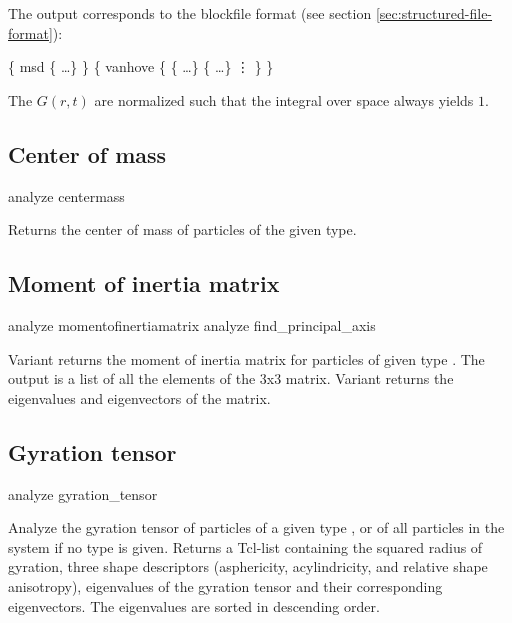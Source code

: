 The output corresponds to the blockfile format (see section
\vref{sec:structured-file-format}):
\begin{code}
\{ msd \{   \dots \} \} 
\{ vanhove \{ \{   \dots \} 
            \{   \dots \}
\vdots
          \}
\}
\end{code}

The $G(r,t)$ are normalized such that the integral over space always
yields $1$.

\subsection{Center of mass}
\label{analyze:centermass}
\begin{essyntax}
  analyze centermass 
\end{essyntax}
Returns the center of mass of particles of the given type.

\subsection{Moment of inertia matrix}
\label{analyze:momentofinteratiamatrix}
\label{analyze:find-principal-axis}

\begin{pysyntax}
\end{pysyntax}
\begin{essyntax}
   analyze momentofinertiamatrix {  } 
   analyze find_principal_axis 
\end{essyntax}
Variant  returns the moment of inertia matrix for particles
of given type . The output is a list of all the elements
of the 3x3 matrix. Variant  returns the eigenvalues and
eigenvectors of the matrix.

\subsection{Gyration tensor}
\label{analyze:gyration-tensor}

\begin{pysyntax}
\end{pysyntax}
\begin{essyntax}
  analyze gyration\_tensor  
\end{essyntax}
Analyze the gyration tensor of particles of a given type ,
or of all particles in the system if no type is given.
Returns a Tcl-list containing the squared radius of gyration,
 three shape descriptors (asphericity, acylindricity,
 and relative shape anisotropy), eigenvalues of the gyration tensor and their
corresponding eigenvectors. The eigenvalues are sorted in descending order.


